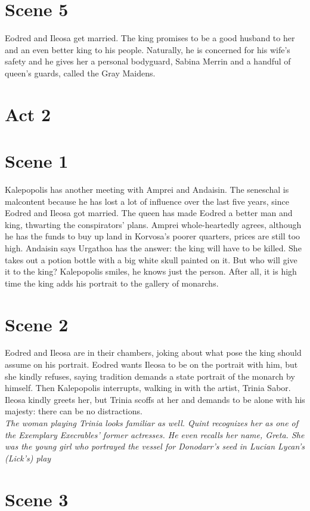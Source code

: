 \section{Scene 5}

Eodred and Ileosa get married. The king promises to be a good husband to her and an even better king to his people. Naturally, he is concerned for his wife's safety and he gives her a personal bodyguard, Sabina Merrin and a handful of queen's guards, called the Gray Maidens.\\

\section{Act 2}

\section{Scene 1}

Kalepopolis has another meeting with Amprei and Andaisin. The seneschal is malcontent because he has lost a lot of influence over the last five years, since Eodred and Ileosa got married. The queen has made Eodred a better man and king, thwarting the conspirators' plans. Amprei whole-heartedly agrees, although he has the funds to buy up land in Korvosa's poorer quarters, prices are still too high. Andaisin says Urgathoa has the answer: the king will have to be killed. She takes out a potion bottle with a big white skull painted on it. But who will give it to the king? Kalepopolis smiles, he knows just the person. After all, it is high time the king adds his portrait to the gallery of monarchs.\\

\section{Scene 2}

Eodred and Ileosa are in their chambers, joking about what pose the king should assume on his portrait. Eodred wants Ileosa to be on the portrait with him, but she kindly refuses, saying tradition demands a state portrait of the monarch by himself. Then Kalepopolis interrupts, walking in with the artist, Trinia Sabor. Ileosa kindly greets her, but Trinia scoffs at her and demands to be alone with his majesty: there can be no distractions.\\

 {\itshape The woman playing Trinia looks familiar as well. Quint recognizes her as one of the Exemplary Execrables' former actresses. He even recalls her name, Greta. She was the young girl who portrayed the vessel for Donodarr's seed in Lucian Lycan's (Lick's) play}  \section{Scene 3}

